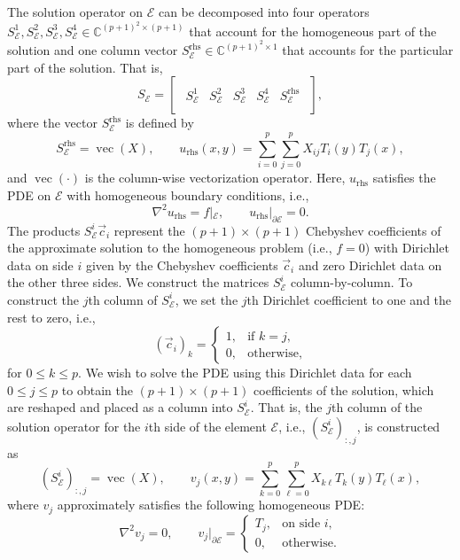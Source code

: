 The solution operator on $\mathcal{E}$ can be decomposed into four operators $S_\mathcal{E}^1, S_\mathcal{E}^2, S_\mathcal{E}^3, S_\mathcal{E}^4 \in \mathbb{C}^{(p+1)^2 \times (p+1)}$ that account for the homogeneous part of the solution and one column vector $S_\mathcal{E}^\text{rhs} \in \mathbb{C}^{(p+1)^2 \times 1}$ that accounts for the particular part of the solution. That is,
\[
S_\mathcal{E} = \begin{bmatrix}\!\begin{array}{cccc|c}
&&&\\[-0.3em]
S_\mathcal{E}^1 & S_\mathcal{E}^2 & S_\mathcal{E}^3 & S_\mathcal{E}^4 & S_\mathcal{E}^\text{rhs}\\[0.8em]
\end{array}\!\end{bmatrix}\!,
\]
where the vector $S_\mathcal{E}^{\text{rhs}}$ is defined by
\[
S_\mathcal{E}^\text{rhs} = \operatorname{vec}(X), \qquad u_\text{rhs}(x,y) = \sum_{i=0}^p \sum_{j=0}^p X_{ij} T_i(y) T_j(x),
\]
and $\operatorname{vec}(\cdot)$ is the column-wise vectorization operator. Here, $u_\text{rhs}$ satisfies the PDE on $\mathcal{E}$ with homogeneous boundary conditions, i.e.,
\[
\nabla^2 u_\text{rhs} = f|_\mathcal{E}, \qquad u_\text{rhs}|_{\partial\mathcal{E}} = 0.
\]
The products $S_\mathcal{E}^i \vec{c}_i$ represent the $(p+1) \times (p+1)$ Chebyshev coefficients of the approximate solution to the homogeneous problem (i.e., $f = 0$) with Dirichlet data on side $i$ given by the Chebyshev coefficients $\vec{c}_i$ and zero Dirichlet data on the other three sides. We construct the matrices $S_\mathcal{E}^i$ column-by-column. To construct the $j$th column of $S_\mathcal{E}^i$, we set the $j$th Dirichlet coefficient to one and the rest to zero, i.e.,
\begin{equation}\label{eq:\chap:delta_coeffs}
(\vec{c}_i)_k = \begin{cases}
1, & \text{if } k=j, \\
0, & \text{otherwise,}
\end{cases}
\end{equation}
for $0 \leq k \leq p$. We wish to solve the PDE using this Dirichlet data for each $0 \leq j \leq p$ to obtain the $(p+1) \times (p+1)$ coefficients of the solution, which are reshaped and placed as a column into $S_\mathcal{E}^i$. That is, the $j$th column of the solution operator for the $i$th side of the element $\mathcal{E}$, i.e., $(S_\mathcal{E}^i)_{:,j}$, is constructed as
\[
(S_\mathcal{E}^i)_{:,j} = \operatorname{vec}(X), \qquad v_j(x,y) = \sum_{k=0}^p \sum_{\ell=0}^p X_{k\ell} T_k(y) T_\ell(x),
\]
where $v_j$ approximately satisfies the following homogeneous PDE:
\[
\nabla^2 v_j = 0, \qquad v_j|_{\partial\mathcal{E}} = \begin{cases} T_j, & \text{on side } i, \\ 0, & \text{otherwise}. \end{cases}
\]

